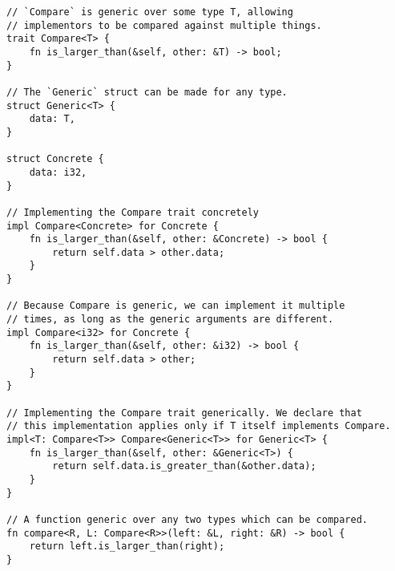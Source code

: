 \begin{verbatim}
// `Compare` is generic over some type T, allowing
// implementors to be compared against multiple things.
trait Compare<T> {
    fn is_larger_than(&self, other: &T) -> bool;
}

// The `Generic` struct can be made for any type.
struct Generic<T> {
    data: T,
}

struct Concrete {
    data: i32,
}

// Implementing the Compare trait concretely
impl Compare<Concrete> for Concrete {
    fn is_larger_than(&self, other: &Concrete) -> bool {
        return self.data > other.data;
    }
}

// Because Compare is generic, we can implement it multiple
// times, as long as the generic arguments are different.
impl Compare<i32> for Concrete {
    fn is_larger_than(&self, other: &i32) -> bool {
        return self.data > other;
    }
}

// Implementing the Compare trait generically. We declare that
// this implementation applies only if T itself implements Compare.
impl<T: Compare<T>> Compare<Generic<T>> for Generic<T> {
    fn is_larger_than(&self, other: &Generic<T>) {
        return self.data.is_greater_than(&other.data);
    }
}

// A function generic over any two types which can be compared.
fn compare<R, L: Compare<R>>(left: &L, right: &R) -> bool {
    return left.is_larger_than(right);
}
\end{verbatim}



